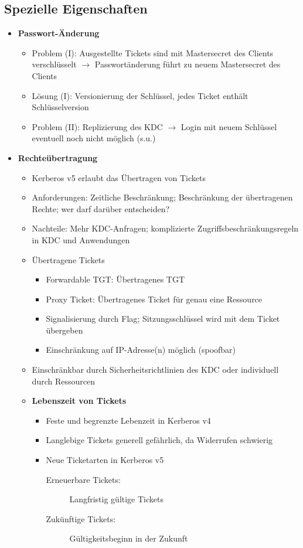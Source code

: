 \subsection{Spezielle Eigenschaften}
\begin{itemize}
	\item \textbf{Passwort-Änderung}
	\begin{itemize}
		\item Problem (I): Ausgestellte Tickets sind  mit Mastersecret des Clients verschlüsselt \(\rightarrow\) Passwortänderung führt zu neuem Mastersecret des Clients
		\item Lösung (I): Versionierung der Schlüssel, jedes Ticket enthält Schlüsselversion
		\item Problem (II): Replizierung des KDC \(\rightarrow\) Login mit neuem Schlüssel eventuell noch nicht möglich (s.u.)
	\end{itemize}
	\item \textbf{Rechteübertragung}
	\begin{itemize}
		\item Kerberos v5 erlaubt das Übertragen von Tickets
		\item Anforderungen: Zeitliche Beschränkung; Beschränkung der übertragenen Rechte; wer darf darüber entscheiden?
		\item Nachteile: Mehr KDC-Anfragen; komplizierte Zugriffsbeschränkungsregeln in KDC und Anwendungen
		\item Übertragene Tickets
		\begin{itemize}
			\item Forwardable TGT: Übertragenes TGT
			\item Proxy Ticket: Übertragenes Ticket für genau eine Ressource
			\item Signalisierung durch Flag; Sitzungsschlüssel wird mit dem Ticket übergeben
			\item Einschränkung auf IP-Adresse(n) möglich (spoofbar)
		\end{itemize}
		\item Einschränkbar durch Sicherheitsrichtlinien des KDC oder individuell durch Ressourcen
		\item \textbf{Lebenszeit von Tickets}
		\begin{itemize}
			\item Feste und begrenzte Lebenzeit in Kerberos v4
			\item Langlebige Tickets generell gefährlich, da Widerrufen schwierig
			\item Neue Ticketarten in Kerberos v5
			\begin{description}
				\item[Erneuerbare Tickets:] Langfristig gültige Tickets
				\item[Zukünftige Tickets:] Gültigkeitsbeginn in der Zukunft
			\end{description}
		\end{itemize}
	\end{itemize}
\end{itemize}


